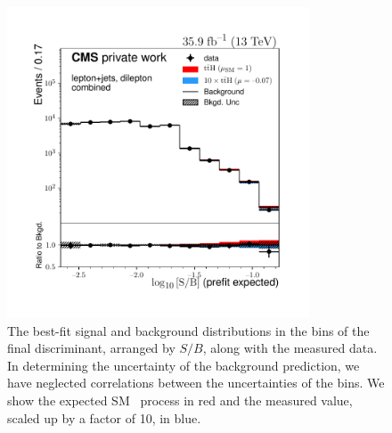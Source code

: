 \begin{figure}
\begin{centering}
\includegraphics[width = 0.8\textwidth]{figures/tth/sob.pdf}
\caption[The final analysis bins, arranged by the signal over background ratio $S/B$]{The best-fit signal and background distributions in the bins of the final discriminant, arranged by $S/B$, along with the measured data. In determining the uncertainty of the background prediction, we have neglected correlations between the uncertainties of the bins. We show the expected SM \ttH~process in red and the measured value, scaled up by a factor of 10, in blue.}
\label{fig:tth_sob}
\end{centering}
\end{figure}

